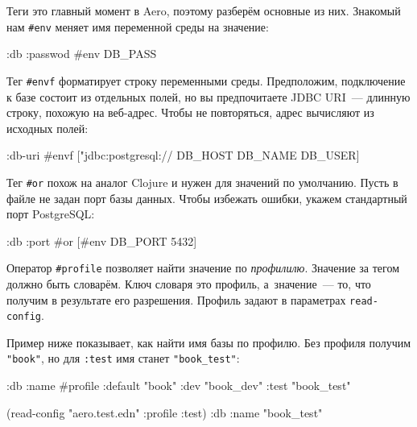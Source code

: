 Теги это главный момент в Aero, поэтому разберём основные из них. Знакомый нам
\verb|#env| меняет имя переменной среды на значение:

\begin{english}
  \begin{clojure}
{:db {:passwod #env DB_PASS}}
  \end{clojure}
\end{english}

Тег \verb|#envf| форматирует строку переменными среды. Предположим,
подключение к базе состоит из отдельных полей, но вы предпочитаете JDBC URI~---
длинную строку, похожую на веб-адрес. Чтобы не повторяться, адрес вычисляют из
исходных полей:

\begin{english}
  \begin{clojure}
{:db-uri #envf ["jdbc:postgresql://%
                DB_HOST DB_NAME DB_USER]}
  \end{clojure}
\end{english}

Тег \verb|#or| похож на аналог Clojure и нужен для значений по
умолчанию. Пусть в файле не задан порт базы данных. Чтобы избежать ошибки,
укажем стандартный порт PostgreSQL:

\begin{english}
  \begin{clojure}
{:db {:port #or [#env DB_PORT 5432]}}
  \end{clojure}
\end{english}


Оператор \verb|#profile| позволяет найти значение по
\emph{профилилю}. Значение за тегом должно быть словарём. Ключ словаря это
профиль, а~значение~--- то, что получим в результате его разрешения. Профиль
задают в параметрах \verb|read-config|.

Пример ниже показывает, как найти имя базы по профилю. Без профиля получим
\verb|"book"|, но для \verb|:test| имя станет \verb|"book_test"|:

\begin{english}
  \begin{clojure}
{:db {:name #profile {:default "book"
                      :dev     "book_dev"
                      :test    "book_test"}}}

(read-config "aero.test.edn" {:profile :test})
{:db {:name "book_test"}}
  \end{clojure}
\end{english}

